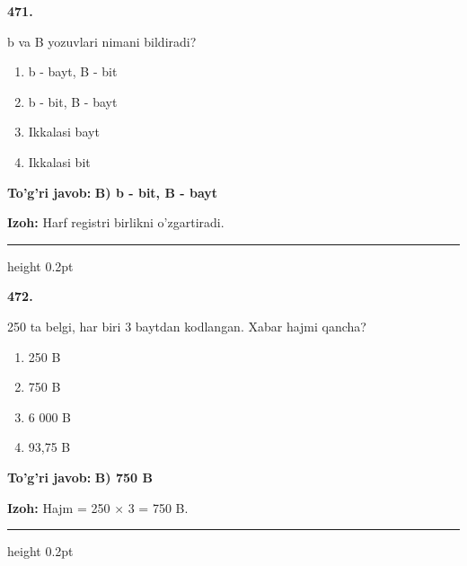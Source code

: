 \documentclass[10pt,a4paper,oneside]{article}
\begin{document}
\noindent\textbf{\color{ink}471.}
\par
b va B yozuvlari nimani bildiradi?
\begin{enumerate}[label=\Alph*),leftmargin=9mm]
\item b - bayt, B - bit
\item b - bit, B - bayt
\item Ikkalasi bayt
\item Ikkalasi bit
\end{enumerate}
\begin{tcolorbox}[enhanced,breakable,colback=teal!4,colframe=teal!50!black,boxrule=0.5pt,arc=1.1mm,left=3mm,right=3mm,top=1.7mm,bottom=1.7mm,before skip=2mm,after skip=2mm]
\textbf{\color{teal}To'g'ri javob:} \textbf{B) b - bit, B - bayt}
\par\smallskip
\textbf{Izoh:} Harf registri birlikni o'zgartiradi.
\end{tcolorbox}
\vspace{2mm}\hrule height 0.2pt \vspace{3mm}

\noindent\textbf{\color{ink}472.}
\par
250 ta belgi, har biri 3 baytdan kodlangan. Xabar hajmi qancha?
\begin{enumerate}[label=\Alph*),leftmargin=9mm]
\item 250 B
\item 750 B
\item 6 000 B
\item 93,75 B
\end{enumerate}
\begin{tcolorbox}[enhanced,breakable,colback=teal!4,colframe=teal!50!black,boxrule=0.5pt,arc=1.1mm,left=3mm,right=3mm,top=1.7mm,bottom=1.7mm,before skip=2mm,after skip=2mm]
\textbf{\color{teal}To'g'ri javob:} \textbf{B) 750 B}
\par\smallskip
\textbf{Izoh:} Hajm = 250 \ensuremath{\times} 3 = 750 B.
\end{tcolorbox}
\vspace{2mm}\hrule height 0.2pt \vspace{3mm}
\end{document}
